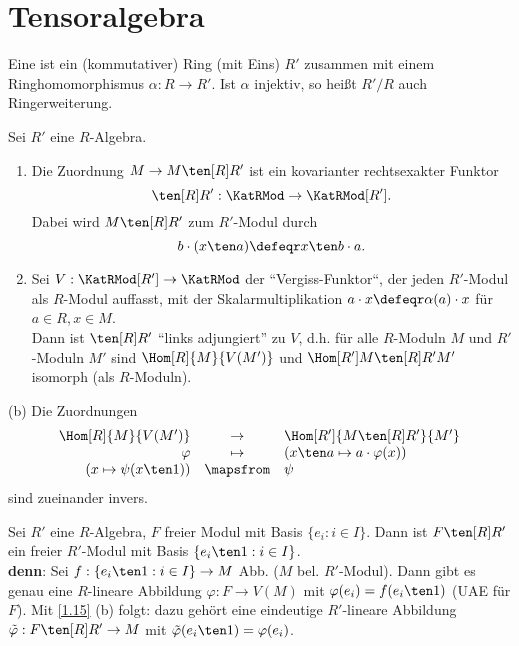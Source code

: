 \section{Tensoralgebra}

\begin{Def}
\label{1.14}
Eine  ist ein (kommutativer) Ring (mit Eins) $R'$
zusammen mit einem Ringhomomorphismus $\alpha: R\to R'$.
Ist $\alpha$ injektiv, so hei\ss t $R'/R$ auch Ringerweiterung.
\end{Def}

\begin{Bem}
\label{1.15}
Sei $R'$ eine $R$-Algebra.
\begin{enumerate}
\item Die Zuordnung $M\to M\ten[R] R'$ ist ein kovarianter rechtsexakter Funktor
\[
\ten[R] R':\KatRMod\to \KatRMod[R'].
\]
Dabei wird $M\ten[R] R'$ zum $R'$-Modul durch
\[
b\cdot (x\ten a)\defeqr x\ten b\cdot a.
\]
\item Sei $V: \KatRMod[R']\to \KatRMod$ der ``Vergiss-Funktor``, der jeden $R'$-Modul als 
$R$-Modul auffasst, mit der Skalarmultiplikation $a\cdot x\defeqr\alpha(a)\cdot x$
f\"ur $a\in R, x\in M$.\\
Dann ist $\ten[R] R'$ ``links adjungiert'' zu $V$, d.h. f\"ur alle 
$R$-Moduln $M$ und $R'$-Moduln $M'$ sind $\Hom[R]{M}{V(M')}$ und 
$\Hom[{R'}]{M\ten[R] R'}{M'}$ isomorph (als $R$-Moduln).
\end{enumerate}
\end{Bem}

\begin{Bew}
\item[(b)] Die Zuordnungen $$\begin{array}{rcl}
\Hom[R]{M}{V(M')} & \to & \Hom[R']{M\ten[R] R'}{M'}\\
\varphi & \mapsto & (x\ten a\mapsto a\cdot \varphi(x))\\
(x\mapsto \psi(x\ten 1))&\mapsfrom & \psi \\
\end{array}$$
sind zueinander invers.
\end{Bew}

\begin{nnBsp}
Sei $R'$ eine $R$-Algebra, $F$ freier Modul mit Basis $\{e_i:i\in I\}$. Dann ist $F\ten[R] R'$ ein freier
$R'$-Modul mit Basis $\{e_i\ten 1:i\in I\}$.\\
\textbf{denn}: Sei $f:\{e_i\ten 1: i\in I\} \to M$ Abb. ($M$ bel. $R'$-Modul).
Dann gibt es genau eine $R$-lineare Abbildung $\varphi: F\to V(M)$ mit $\varphi(e_i)=f(e_i\ten 1)$ (UAE f\"ur $F$).
Mit \ref{1.15} (b) folgt: dazu geh\"ort eine eindeutige $R'$-lineare Abbildung
$\tilde\varphi: F\ten[R] R'\to M$ mit $\tilde\varphi(e_i\ten 1)=\varphi(e_i)$.
\end{nnBsp}


